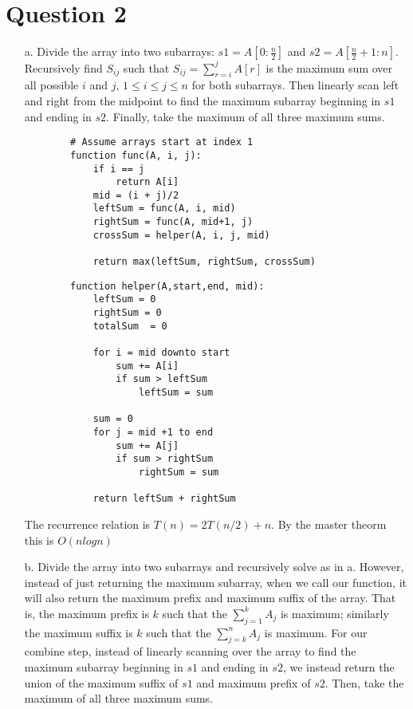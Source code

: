 \documentclass[12pt]{article}
\begin{document}
\section*{Question 2}
\begin{enumerate}
    \item[a.] Divide the array into two subarrays: $s1 = A[0:\frac{n}{2}]$ and $s2 = A[\frac{n}{2} + 1:n]$. Recursively find $S_{ij}$ such that $S_{ij} = \sum_{r=i}^j A[r]$ is the maximum sum over all possible $i$ and $j$, $1 \leq i \leq j \leq n$ for both subarrays. Then linearly scan left and right from the midpoint to find the maximum subarray beginning in $s1$ and ending in $s2$. Finally, take the maximum of all three maximum sums. 
    \begin{verbatim}
        # Assume arrays start at index 1
        function func(A, i, j):
            if i == j
                return A[i]
            mid = (i + j)/2
            leftSum = func(A, i, mid)
            rightSum = func(A, mid+1, j)
            crossSum = helper(A, i, j, mid)
        
            return max(leftSum, rightSum, crossSum)
    \end{verbatim}
    
    \begin{verbatim}
        function helper(A,start,end, mid):
            leftSum = 0
            rightSum = 0
            totalSum  = 0
        
            for i = mid downto start
                sum += A[i]
                if sum > leftSum
                    leftSum = sum
            
            sum = 0
            for j = mid +1 to end
                sum += A[j]
                if sum > rightSum
                    rightSum = sum
            
            return leftSum + rightSum
    \end{verbatim}
    
    The recurrence relation is $T(n) = 2T(n/2) + n$. By the master theorm this is $O(nlogn)$
    
    \item[b.] Divide the array into two subarrays and recursively solve as in a. However, instead of just returning the maximum subarray, when we call our function, it will also return the maximum prefix and maximum suffix of the array. That is, the maximum prefix is $k$ such that the $\sum_{j=1}^k A_j$ is maximum; similarly the maximum suffix is $k$ such that the $\sum_{j=k}^n A_j$ is maximum. For our combine step, instead of linearly scanning over the array to find the maximum subarray beginning in $s1$ and ending in $s2$, we instead return the union of the maximum 
    suffix of $s1$ and maximum prefix of $s2$. Then, take the maximum of all three maximum sums.


\end{enumerate}
\end{document}
